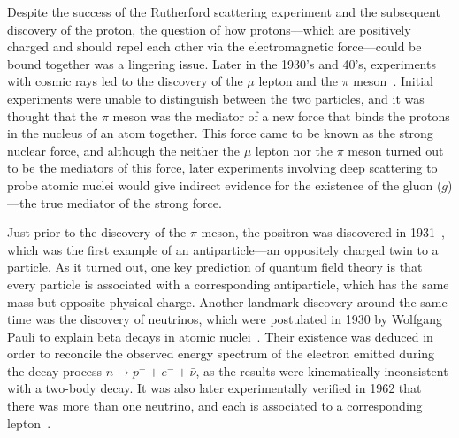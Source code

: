 Despite the success of the Rutherford scattering experiment and the subsequent discovery of the proton, the question of how protons---which are positively charged and should repel each other via the electromagnetic force---could be bound together was a lingering issue.
Later in the 1930's and 40's, experiments with cosmic rays led to the discovery of the $\mu$ lepton and the $\pi$ meson~\cite{Lattes_1947}.
Initial experiments were unable to distinguish between the two particles, and it was thought that the $\pi$ meson was the mediator of a new force that binds the protons in the nucleus of an atom together.
This force came to be known as the strong nuclear force, and although the neither the $\mu$ lepton nor the $\pi$ meson turned out to be the mediators of this force, later experiments involving deep scattering to probe atomic nuclei would give indirect evidence for the existence of the gluon ($g$)---the true mediator of the strong force.

Just prior to the discovery of the $\pi$ meson, the positron was discovered in 1931~\cite{doi:10.1119/1.1937627}, which was the first example of an antiparticle---an oppositely charged twin to a particle.
As it turned out, one key prediction of quantum field theory is that every particle is associated with a corresponding antiparticle, which has the same mass but opposite physical charge.
Another landmark discovery around the same time was the discovery of neutrinos, which were postulated in 1930 by Wolfgang Pauli to explain beta decays in atomic nuclei~\cite{Reines-Cowan}.
Their existence was deduced in order to reconcile the observed energy spectrum of the electron emitted during the decay process $n\to p^++e^-+\bar{\nu}$, as the results were kinematically inconsistent with a two-body decay.
It was also later experimentally verified in 1962 that there was more than one neutrino, and each is associated to a corresponding lepton~\cite{doi:10.1119/1.1976245}.

